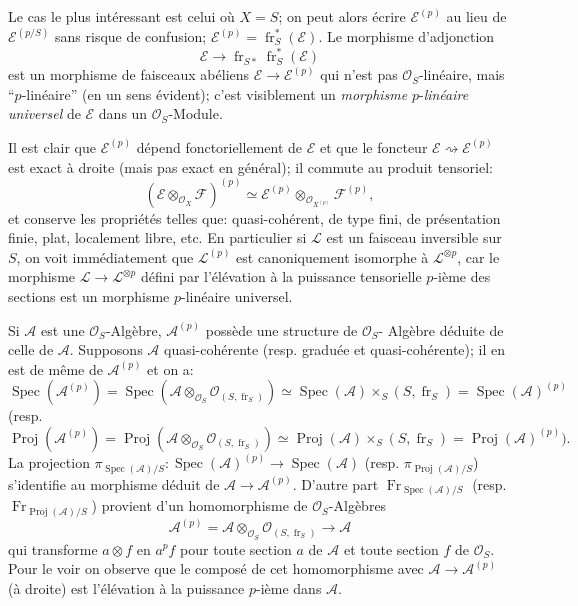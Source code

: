 \documentclass[11pt]{article}
\DeclareMathOperator{\Spec}{Spec}
\providecommand{\OO}{\mathcal{O}}
\providecommand{\cE}{\mathcal E}
\providecommand{\cF}{\mathcal F}
\providecommand{\Spec}{\operatorname{Spec}}
\providecommand{\Spec}{\operatorname{Spec}}
\providecommand{\Spec}{\operatorname{Spec}}
\providecommand{\fr}{\operatorname{fr}}
\providecommand{\Fr}{\operatorname{Fr}}
\providecommand{\Proj}{\operatorname{Proj}}
\providecommand{\cL}{\mathcal L}
\providecommand{\Fr}{\operatorname{Fr}}
\providecommand{\fr}{\operatorname{fr}}
\providecommand{\Spec}{\operatorname{Spec}}
\begin{document}
Le cas le plus intéressant est celui où $X=S$; on peut alors écrire $\cE^{(p)}$ au lieu de $\cE^{(p/S)}$ sans risque de confusion; $\cE^{(p)}=\fr_S^*(\cE)$. Le morphisme d'adjonction
\[
\cE\longrightarrow \fr_{S*}\fr_S^*(\cE)
\]
est un morphisme de faisceaux abéliens $\cE\to\cE^{(p)}$ qui n'est pas $\OO_S$-linéaire, mais ``$p$-linéaire'' (en un sens évident); c'est visiblement un \emph{morphisme} $p$-\emph{linéaire universel} de $\cE$ dans un $\OO_S$-Module.

Il est clair que $\cE^{(p)}$ dépend fonctoriellement de $\cE$ et que le foncteur $\cE\rightsquigarrow\cE^{(p)}$ est exact à droite (mais pas exact en général); il commute au produit tensoriel:
\[
(\cE\otimes_{\OO_X}\cF)^{(p)}\simeq
\cE^{(p)}\otimes_{\OO_{X^{(p)}}}\cF^{(p)},
\]
et conserve les propriétés telles que: quasi-cohérent, de type fini, de présentation finie, plat, localement libre, etc. En particulier si $\cL$ est un faisceau inversible sur $S$, on voit immédiatement que $\cL^{(p)}$ est canoniquement isomorphe à $\cL^{\otimes p}$, car le morphisme $\cL\to\cL^{\otimes p}$ défini par l'élévation à la puissance tensorielle $p$-ième des sections est un morphisme $p$-linéaire universel.

Si $\mathcal{A}$ est une $\OO_S$-Algèbre, $\mathcal{A}^{(p)}$ possède une structure de $\OO_S$-
Algèbre déduite de celle de $\mathcal{A}$. Supposons $\mathcal{A}$ quasi-cohérente (resp. graduée et quasi-cohérente); il en est de même de $\mathcal{A}^{(p)}$ et on a:
\[
\Spec(\mathcal{A}^{(p)})=\Spec(\mathcal{A}\otimes_{\OO_S}\OO_{(S,\fr_S)})
 \simeq \Spec(\mathcal{A})\times_S(S,\fr_S)=\Spec(\mathcal{A})^{(p)}
\]
(resp.
\[
\Proj(\mathcal{A}^{(p)})=\Proj(\mathcal{A}\otimes_{\OO_S}\OO_{(S,\fr_S)})
 \simeq \Proj(\mathcal{A})\times_S(S,\fr_S)=\Proj(\mathcal{A})^{(p)}).
\]
La projection $\pi_{\Spec(\mathcal{A})/S}:\Spec(\mathcal{A})^{(p)}\to\Spec(\mathcal{A})$ (resp. $\pi_{\Proj(\mathcal{A})/S}$) s'identifie au morphisme déduit de $\mathcal{A}\to\mathcal{A}^{(p)}$. D'autre part $\Fr_{\Spec(\mathcal{A})/S}$ (resp. $\Fr_{\Proj(\mathcal{A})/S}$) provient d'un homomorphisme de $\OO_S$-Algèbres
\[
\mathcal{A}^{(p)}=\mathcal{A}\otimes_{\OO_S}\OO_{(S,\fr_S)}\longrightarrow \mathcal{A}
\]
qui transforme $a\otimes f$ en $a^p f$ pour toute section $a$ de $\mathcal{A}$ et toute section $f$ de $\OO_S$. Pour le voir on observe que le composé de cet homomorphisme avec $\mathcal{A}\to\mathcal{A}^{(p)}$ (à droite) est l'élévation à la puissance $p$-ième dans $\mathcal{A}$.
\end{document}
